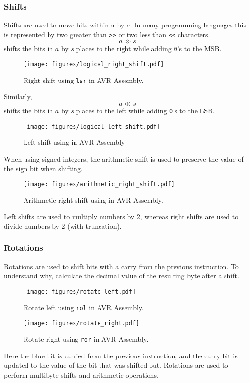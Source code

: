\documentclass{article}
\newcommand{\keyword}[1]{\textcolor[rgb]{0.00,0.50,0.00}{\textbf{#1}}}
\begin{document}
\subsubsection{Shifts}
Shifts are used to move bits within a byte. In many programming
languages this is represented by two greater than \texttt{>>}
or two less than \texttt{<<} characters.
\begin{equation*}
    a \gg s
\end{equation*}
shifts the bits in \(a\) by \(s\) places to the right while adding \texttt{0}'s to the MSB.\
\begin{figure}[H]
    \centering
    \texttt{[image: figures/logical\_right\_shift.pdf]}
    \caption{Right shift using \texttt{lsr} in AVR Assembly.} %
\end{figure}
Similarly,
\begin{equation*}
    a \ll s
\end{equation*}
shifts the bits in \(a\) by \(s\) places to the left while adding \texttt{0}'s to the LSB.\
\begin{figure}[H]
    \centering
    \texttt{[image: figures/logical\_left\_shift.pdf]}
    \caption{Left shift using \keyword{} in AVR Assembly.} %
\end{figure}
When using signed integers, the arithmetic shift is used to preserve the value of the sign bit when shifting.
\begin{figure}[H]
    \centering
    \texttt{[image: figures/arithmetic\_right\_shift.pdf]}
    \caption{Arithmetic right shift using \keyword{} in AVR Assembly.} %
\end{figure}
Left shifts are used to multiply numbers by 2, whereas right shifts are used to divide numbers by 2 (with truncation).
\subsubsection{Rotations}
Rotations are used to shift bits with a carry from the previous
instruction. To understand why, calculate the decimal value of the
resulting byte after a shift.
\begin{figure}[H]
    \centering
    \texttt{[image: figures/rotate\_left.pdf]}
    \caption{Rotate left using \texttt{rol} in AVR Assembly.} %
\end{figure}
\begin{figure}[H]
    \centering
    \texttt{[image: figures/rotate\_right.pdf]}
    \caption{Rotate right using \texttt{ror} in AVR Assembly.} %
\end{figure}
Here the blue bit is carried from the previous instruction, and the carry bit is updated
to the value of the bit that was shifted out.
Rotations are used to perform multibyte shifts and arithmetic operations.
\end{document}
